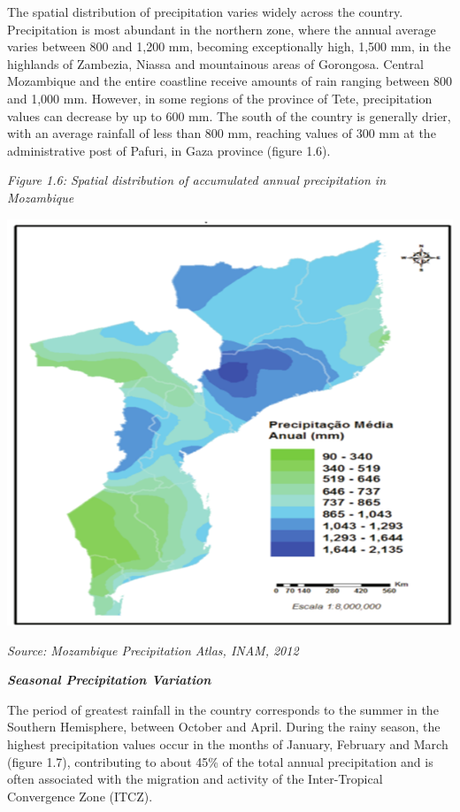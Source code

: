 \documentclass[
]{book}
\begin{document}
The spatial distribution of precipitation varies widely across the country. Precipitation is most abundant in the northern zone, where the annual average varies between 800 and 1,200 mm, becoming exceptionally high, 1,500 mm, in the highlands of Zambezia, Niassa and mountainous areas of Gorongosa. Central Mozambique and the entire coastline receive amounts of rain ranging between 800 and 1,000 mm. However, in some regions of the province of Tete, precipitation values can decrease by up to 600 mm. The south of the country is generally drier, with an average rainfall of less than 800 mm, reaching values of 300 mm at the administrative post of Pafuri, in Gaza province (figure 1.6).

\emph{Figure 1.6: Spatial distribution of accumulated annual precipitation in Mozambique}

\includegraphics{Figure12.png}

\emph{Source: Mozambique Precipitation Atlas, INAM, 2012}

\textbf{\emph{Seasonal Precipitation Variation}}

The period of greatest rainfall in the country corresponds to the summer in the Southern Hemisphere, between October and April. During the rainy season, the highest precipitation values occur in the months of January, February and March (figure 1.7), contributing to about 45\% of the total annual precipitation and is often associated with the migration and activity of the Inter-Tropical Convergence Zone (ITCZ).
\end{document}
